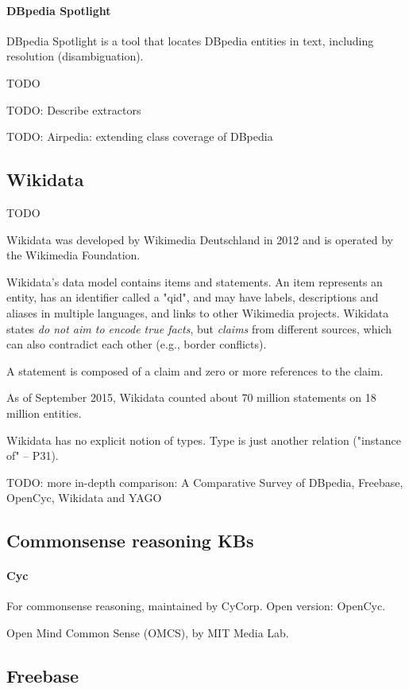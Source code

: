 \paragraph{DBpedia Spotlight}
DBpedia Spotlight is a tool that locates DBpedia entities in text, including
resolution (disambiguation).

TODO

TODO: Describe extractors

TODO: Airpedia: extending class coverage of DBpedia

\subsection{Wikidata}

TODO

Wikidata was developed by Wikimedia Deutschland in 2012 and is operated by the
Wikimedia Foundation.

Wikidata's data model contains items and statements. An item represents an
entity, has an identifier called a "qid", and may have labels, descriptions and
aliases in multiple languages, and links to other Wikimedia projects. Wikidata
states \textit{do not aim to encode true facts}, but \textit{claims} from
different sources, which can also contradict each other (e.g., border
conflicts).

A statement is composed of a claim and zero or more references to the claim.

As of September 2015, Wikidata counted about 70 million statements on 18 million
entities.

Wikidata has no explicit notion of types. Type is just another relation
("instance of" -- P31).

TODO: more in-depth comparison: A Comparative Survey of DBpedia, Freebase,
OpenCyc, Wikidata and YAGO

\subsection{Commonsense reasoning KBs}

\paragraph{Cyc} For commonsense reasoning, maintained by CyCorp.
Open version: OpenCyc.

Open Mind Common Sense (OMCS), by MIT Media Lab.

\subsection{Freebase}

